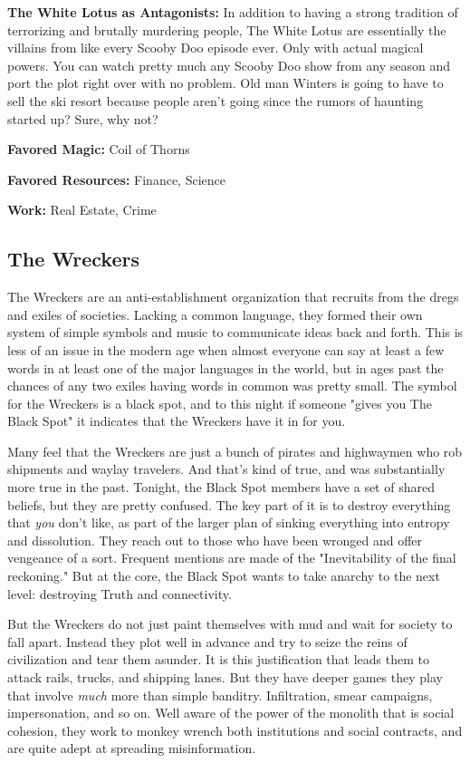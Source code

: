 \textbf{The White Lotus as Antagonists:} In addition to having a strong tradition of terrorizing and brutally murdering people, The White Lotus are essentially the villains from like every Scooby Doo episode ever. Only with actual magical powers. You can watch pretty much any Scooby Doo show from any season and port the plot right over with no problem. Old man Winters is going to have to sell the ski resort because people aren't going since the rumors of haunting started up? Sure, why not?

\textbf{Favored Magic:}  Coil of Thorns

\textbf{Favored Resources:} Finance, Science

\textbf{Work:} Real Estate, Crime

\subsection{The Wreckers} 

The Wreckers are an anti-establishment organization that recruits from the dregs and exiles of societies. Lacking a common language, they formed their own system of simple symbols and music to communicate ideas back and forth. This is less of an issue in the modern age when almost everyone can say at least a few words in at least one of the major languages in the world, but in ages past the chances of any two exiles having words in common was pretty small. The symbol for the Wreckers is a black spot, and to this night if someone "gives you The Black Spot" it indicates that the Wreckers have it in for you.

Many feel that the Wreckers are just a bunch of pirates and highwaymen who rob shipments and waylay travelers. And that's kind of true, and was substantially more true in the past. Tonight, the Black Spot members have a set of shared beliefs, but they are pretty confused. The key part of it is to destroy everything that \textit{you} don't like, as part of the larger plan of sinking everything into entropy and dissolution. They reach out to those who have been wronged and offer vengeance of a sort. Frequent mentions are made of the "Inevitability of the final reckoning." But at the core, the Black Spot wants to take anarchy to the next level: destroying Truth and connectivity.

But the Wreckers do not just paint themselves with mud and wait for society to fall apart. Instead they plot well in advance and try to seize the reins of civilization and tear them asunder. It is this justification that leads them to attack rails, trucks, and shipping lanes. But they have deeper games they play that involve \textit{much} more than simple banditry. Infiltration, smear campaigns, impersonation, and so on. Well aware of the power of the monolith that is social cohesion, they work to monkey wrench both institutions and social contracts, and are quite adept at spreading misinformation.

